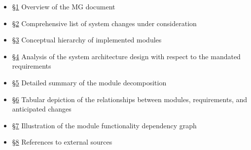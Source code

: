 \documentclass[12pt, titlepage]{article}
\begin{document}
        \begin{itemize}
            \item[] \hyperref[SecIntro]{\S1} Overview of the MG document
            \item[] \hyperref[SecChange]{\S2} Comprehensive list of system changes under consideration
            \item[] \hyperref[SecMH]{\S3} Conceptual hierarchy of implemented modules
            \item[] \hyperref[SecConnection]{\S4} Analysis of the system architecture design with respect to the mandated requirements
            \item[] \hyperref[SecMD]{\S5} Detailed summary of the module decomposition 
            \item[] \hyperref[SecTM]{\S6} Tabular depiction of the relationships between modules, requirements, and anticipated changes
            \item[] \hyperref[SecUse]{\S7} Illustration of the module functionality dependency graph
            \item[] \hyperref[SecRef]{\S8} References to external sources
        \end{itemize}
\end{document}
